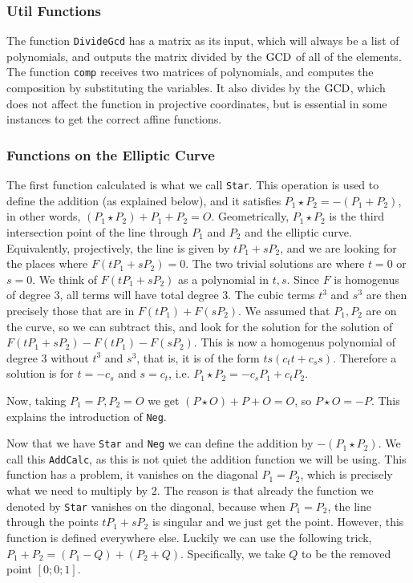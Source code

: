 \subsubsection{Util Functions}

The function \texttt{DivideGcd} has a matrix as its input, which will always be a list of polynomials, and outputs the matrix divided by the $\operatorname{GCD}$ of all of the elements.
The function \texttt{comp} receives two matrices of polynomials, and computes the composition by substituting the variables.
It also divides by the $\operatorname{GCD}$, which does not affect the function in projective coordinates, but is essential in some instances to get the correct affine functions.

\subsubsection{Functions on the Elliptic Curve}

The first function calculated is what we call \texttt{Star}.
This operation is used to define the addition (as explained below), and it satisfies $P_1 \star P_2 = - \left(P_1 + P_2\right)$, in other words, $\left(P_1 \star P_2\right) + P_1 + P_2 = O$.
Geometrically, $P_1 \star P_2$ is the third intersection point of the line through $P_1$ and $P_2$ and the elliptic curve.
Equivalently, projectively, the line is given by $t P_1 + s P_2$, and we are looking for the places where $F\left(t P_1 + s P_2\right) = 0$.
The two trivial solutions are where $t = 0$ or $s = 0$.
We think of $F\left(t P_1 + s P_2\right)$ as a polynomial in $t,s$.
Since $F$ is homogenus of degree $3$, all terms will have total degree $3$.
The cubic terms $t^3$ and $s^3$ are then precisely those that are in $F\left(t P_1\right) + F\left(s P_2\right)$.
We assumed that $P_1,P_2$ are on the curve, so we can subtract this, and look for the solution for the solution of $F\left(t P_1 + s P_2\right) - F\left(t P_1\right) - F\left(s P_2\right)$.
This is now a homogenus polynomial of degree $3$ without $t^3$ and $s^3$, that is, it is of the form $t s \left(c_t t + c_s s\right)$.
Therefore a solution is for $t = -c_s$ and $s = c_t$, i.e. $P_1 \star P_2 = -c_s P_1 + c_t P_2$.

Now, taking $P_1 = P, P_2 = O$ we get $\left(P \star O\right) + P + O = O$, so $P \star O = -P$.
This explains the introduction of \texttt{Neg}.

Now that we have \texttt{Star} and \texttt{Neg} we can define the addition by $-\left(P_1 \star P_2\right)$.
We call this \texttt{AddCalc}, as this is not quiet the addition function we will be using.
This function has a problem, it vanishes on the diagonal $P_1 = P_2$, which is precisely what we need to multiply by $2$.
The reason is that already the function we denoted by \texttt{Star} vanishes on the diagonal, because when $P_1 = P_2$, the line through the points $t P_1 + s P_2$ is singular and we just get the point.
However, this function is defined everywhere else.
Luckily we can use the following trick, $P_1 + P_2 = \left(P_1 - Q\right) + \left(P_2 + Q\right)$.
Specifically, we take $Q$ to be the removed point $\left[0;0;1\right]$.

